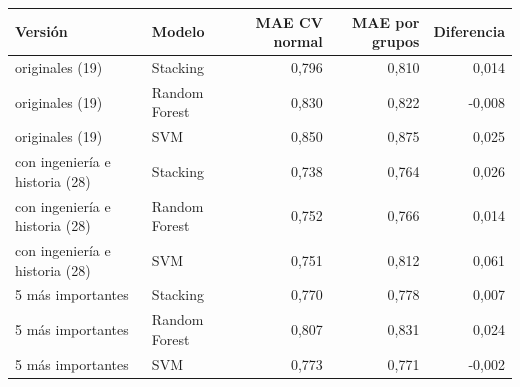 \begin{tabular}{llrrr}
\toprule
Versión & Modelo & MAE CV normal & MAE por grupos & Diferencia \\
\midrule
originales (19) & Stacking & 0,796 & 0,810 & 0,014 \\
originales (19) & Random Forest & 0,830 & 0,822 & -0,008 \\
originales (19) & SVM & 0,850 & 0,875 & 0,025 \\
con ingeniería e historia (28) & Stacking & 0,738 & 0,764 & 0,026 \\
con ingeniería e historia (28) & Random Forest & 0,752 & 0,766 & 0,014 \\
con ingeniería e historia (28) & SVM & 0,751 & 0,812 & 0,061 \\
5 más importantes & Stacking & 0,770 & 0,778 & 0,007 \\
5 más importantes & Random Forest & 0,807 & 0,831 & 0,024 \\
5 más importantes & SVM & 0,773 & 0,771 & -0,002 \\
\bottomrule
\end{tabular}
